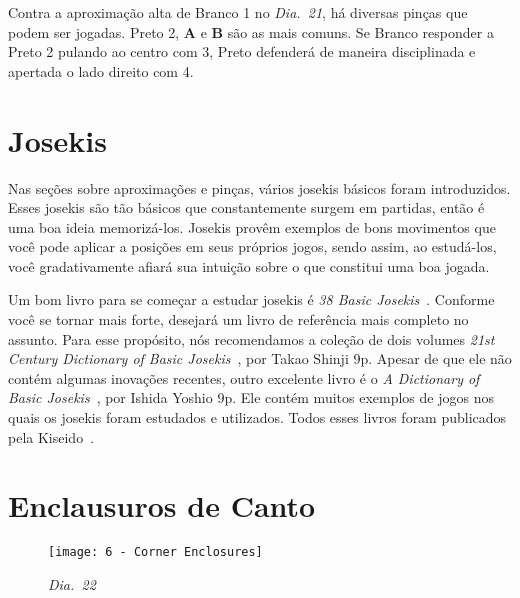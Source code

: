 Contra a aproximação alta de Branco 1 no \emph{Dia.\@~21}, há diversas pinças que podem ser jogadas. Preto 2, \textbf{A} e \textbf{B} são as mais comuns. Se Branco responder a Preto 2 pulando ao centro com 3, Preto defenderá de maneira disciplinada e apertada o lado direito com 4.

\pagebreak

\section{Josekis}

Nas seções sobre aproximações e pinças, vários josekis básicos foram introduzidos. Esses josekis são tão básicos que constantemente surgem em partidas, então é uma boa ideia memorizá-los. Josekis provêm exemplos de bons movimentos que você pode aplicar a posições em seus próprios jogos, sendo assim, ao estudá-los, você gradativamente afiará sua intuição sobre o que constitui uma boa jogada.

Um bom livro para se começar a estudar josekis é \emph{38 Basic Josekis}~\cite{kosugi_bozulich_38_basic_joseki}. Conforme você se tornar mais forte, desejará um livro de referência mais completo no assunto. Para esse propósito, nós recomendamos a coleção de dois volumes \emph{21st Century Dictionary of Basic Josekis}~\cite{takao_shinji_21st_century_joseki_dictionary}, por Takao Shinji 9p. Apesar de que ele não contém algumas inovações recentes, outro excelente livro é o \emph{A Dictionary of Basic Josekis}~\cite{ishida_yoshio_basic_joseki_dictionary}, por Ishida Yoshio 9p. Ele contém muitos exemplos de jogos nos quais os josekis foram estudados e utilizados. Todos esses livros foram publicados pela Kiseido~\cite{kiseido}.

\pagebreak

\section{Enclausuros de Canto}

\begin{wrapfigure}{r}{60mm}
    \vspace{-30pt}
    \begin{center}
        \texttt{[image: 6 - Corner Enclosures]}
        \captionsetup{justification=centering}
        \caption*{\emph{Dia.\@~22}}
    \end{center}
    \vspace{-20pt}
\end{wrapfigure}

